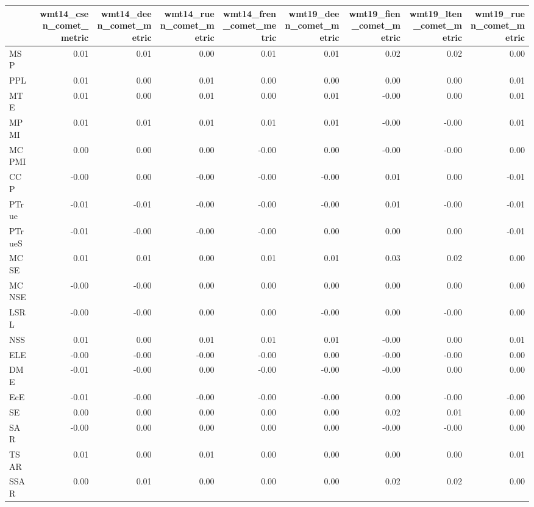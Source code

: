 \begin{tabular}{lrrrrrrrr}
\toprule
 & wmt14\_csen\_comet\_metric & wmt14\_deen\_comet\_metric & wmt14\_ruen\_comet\_metric & wmt14\_fren\_comet\_metric & wmt19\_deen\_comet\_metric & wmt19\_fien\_comet\_metric & wmt19\_lten\_comet\_metric & wmt19\_ruen\_comet\_metric \\
\midrule
MSP & 0.01 & 0.01 & 0.00 & 0.01 & 0.01 & 0.02 & 0.02 & 0.00 \\
PPL & 0.01 & 0.00 & 0.01 & 0.00 & 0.00 & 0.00 & 0.00 & 0.01 \\
MTE & 0.01 & 0.00 & 0.01 & 0.00 & 0.01 & -0.00 & 0.00 & 0.01 \\
MPMI & 0.01 & 0.01 & 0.01 & 0.01 & 0.01 & -0.00 & -0.00 & 0.01 \\
MCPMI & 0.00 & 0.00 & 0.00 & -0.00 & 0.00 & -0.00 & -0.00 & 0.00 \\
CCP & -0.00 & 0.00 & -0.00 & -0.00 & -0.00 & 0.01 & 0.00 & -0.01 \\
PTrue & -0.01 & -0.01 & -0.00 & -0.00 & -0.00 & 0.01 & -0.00 & -0.01 \\
PTrueS & -0.01 & -0.00 & -0.00 & -0.00 & 0.00 & 0.00 & 0.00 & -0.01 \\
MCSE & 0.01 & 0.01 & 0.00 & 0.01 & 0.01 & 0.03 & 0.02 & 0.00 \\
MCNSE & -0.00 & -0.00 & 0.00 & 0.00 & 0.00 & 0.00 & 0.00 & 0.00 \\
LSRL & -0.00 & -0.00 & 0.00 & 0.00 & -0.00 & 0.00 & -0.00 & 0.00 \\
NSS & 0.01 & 0.00 & 0.01 & 0.01 & 0.01 & -0.00 & 0.00 & 0.01 \\
ELE & -0.00 & -0.00 & -0.00 & -0.00 & 0.00 & -0.00 & -0.00 & 0.00 \\
DME & -0.01 & -0.00 & 0.00 & -0.00 & -0.00 & -0.00 & 0.00 & 0.00 \\
EcE & -0.01 & -0.00 & -0.00 & -0.00 & -0.00 & 0.00 & -0.00 & -0.00 \\
SE & 0.00 & 0.00 & 0.00 & 0.00 & 0.00 & 0.02 & 0.01 & 0.00 \\
SAR & -0.00 & 0.00 & 0.00 & 0.00 & 0.00 & -0.00 & -0.00 & 0.00 \\
TSAR & 0.01 & 0.00 & 0.01 & 0.00 & 0.00 & 0.00 & 0.00 & 0.01 \\
SSAR & 0.00 & 0.01 & 0.00 & 0.00 & 0.00 & 0.02 & 0.02 & 0.00 \\
\bottomrule
\end{tabular}
